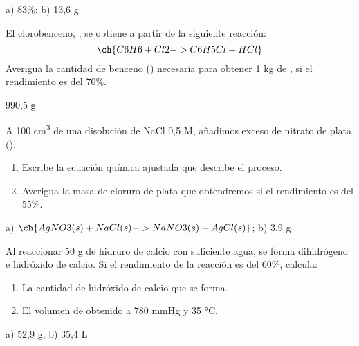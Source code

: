 \documentclass[
]{article}
\providecommand{\tightlist}{%
  \setlength{\itemsep}{0pt}\setlength{\parskip}{0pt}}
\begin{document}
\begin{solution}a) 83\%; b) 13,6 g\end{solution}

\begin{exercise}[tags=OXF15] El clorobenceno, , se obtiene a
partir de la siguiente reacción: \[\ch{C6H6 + Cl2 -> C6H5Cl + HCl}\]
Averigua la cantidad de benceno () necesaria para obtener 1 kg
de , si el rendimiento es del 70\%.\end{exercise}

\begin{solution}990,5 g\end{solution}

\begin{exercise}[tags=OXF15] A 100 cm\textsuperscript{3} de una
disolución de NaCl 0,5 M, añadimos exceso de nitrato de plata
().

\begin{enumerate}
\def\labelenumi{\alph{enumi})}
\tightlist
\item
  Escribe la ecuación química ajustada que describe el proceso.
\item
  Averigua la masa de cloruro de plata que obtendremos si el rendimiento
  es del 55\%.
\end{enumerate}

\end{exercise}

\begin{solution}a) \(\ch{AgNO3(s) + NaCl(s) -> NaNO3(s) + AgCl(s)}\); b)
3,9 g\end{solution}

\begin{exercise}[tags=OXF15] Al reaccionar 50 g de hidruro de calcio con
suficiente agua, se forma dihidrógeno e hidróxido de calcio. Si el
rendimiento de la reacción es del 60\%, calcula:

\begin{enumerate}
\def\labelenumi{\alph{enumi})}
\tightlist
\item
  La cantidad de hidróxido de calcio que se forma.
\item
  El volumen de  obtenido a 780 mmHg y 35 °C.
\end{enumerate}

\end{exercise}

\begin{solution}a) 52,9 g; b) 35,4 L\end{solution}
\end{document}
